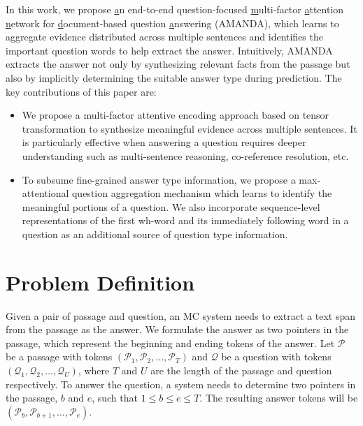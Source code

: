 \documentclass[letterpaper]{article} %
\begin{document}
In this work, we propose \underline{a}n end-to-end question-focused \underline{m}ulti-factor \underline{a}ttention \underline{n}etwork for \underline{d}ocument-based question \underline{a}nswering (AMANDA), which learns to aggregate evidence distributed across multiple sentences and identifies the important question words to help extract the answer. 
Intuitively, AMANDA extracts the answer not only by synthesizing relevant facts from the passage but also by implicitly determining the suitable answer type during prediction.
The key contributions of this paper are:
\begin{itemize}
\item We propose a multi-factor attentive encoding approach based on tensor transformation to synthesize meaningful evidence across multiple sentences. It is particularly effective when answering a question requires deeper understanding such as multi-sentence reasoning, co-reference resolution, etc.
\item To subsume fine-grained answer type information, we propose a max-attentional question aggregation mechanism which learns to identify the meaningful portions of a question. We also incorporate sequence-level representations of the first wh-word and its immediately following word in a question as an additional source of question type information.


\end{itemize}
\section{Problem Definition}
\label{sec:prob_def}
Given a pair of passage and question, an MC system needs to extract a text span from the passage as the answer. We formulate the answer as two pointers in the passage, which represent the beginning and ending tokens of the answer. Let $\mathcal{P}$ be a passage with tokens $(\mathcal{P}_1, \mathcal{P}_2, \ldots, \mathcal{P}_T)$ and $\mathcal{Q}$ be a question with tokens $(\mathcal{Q}_1,\mathcal{Q}_2, \ldots, \mathcal{Q}_U)$, where $T$ and $U$ are the length of the passage and question respectively. To answer the question, a system needs to determine two pointers in the passage, $b$ and $e$, such that $1 \leq b \leq e \leq T$. The resulting answer tokens will be $(\mathcal{P}_b, \mathcal{P}_{b+1}, \ldots, \mathcal{P}_e)$. 
\end{document}
